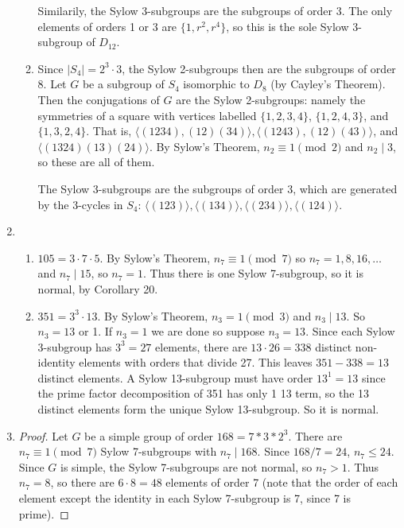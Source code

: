 \documentclass[11pt, letterpaper]{article}
\begin{document}
\begin{enumerate}
\begin{enumerate}
    Similarily, the Sylow 3-subgroups are the subgroups of order 3. The only elements of orders 1 or 3 are $\lbrace 1, r^2, r^4 \rbrace$, so this is the sole Sylow 3-subgroup of $D_{12}$.

    \item Since $\vert S_4 \vert = 2^3 \cdot 3$, the Sylow 2-subgroups then are the subgroups of order 8. Let $G$ be a subgroup of $S_4$ isomorphic to $D_8$ (by Cayley's Theorem). Then the conjugations of $G$ are the Sylow 2-subgroups: namely the symmetries of a square with vertices labelled $\lbrace 1,2,3,4 \rbrace$, $\lbrace 1,2,4,3 \rbrace$, and $\lbrace 1,3,2,4 \rbrace$. That is, $\langle (1234), (12)(34) \rangle, \langle (1243), (12)(43) \rangle$, and $\langle (1324) (13)(24) \rangle$. By Sylow's Theorem, $n_2 \equiv 1 \pmod 2$ and $n_2 \mid 3$, so these are all of them.
    
    The Sylow 3-subgroups are the subgroups of order 3, which are generated by the 3-cycles in $S_4$: $\langle (123) \rangle, \langle (134) \rangle, \langle (234) \rangle, \langle (124) \rangle$.
  \end{enumerate}

  \item \begin{enumerate}
    \item $105 = 3 \cdot 7 \cdot 5$. By Sylow's Theorem, $n_{7} \equiv 1 \pmod 7$ so $n_7 = 1, 8, 16, \dots$ and $n_{7} \mid 15$, so $n_7 = 1$. Thus there is one Sylow 7-subgroup, so it is normal, by Corollary 20.
    \item $351 = 3^3 \cdot 13$. By Sylow's Theorem, $n_3 = 1 \pmod 3$ and $n_3 \mid 13$. So $n_3 = 13$ or 1. If $n_3 = 1$ we are done so suppose $n_3 = 13$. Since each Sylow 3-subgroup has $3^3 = 27$ elements, there are $13 \cdot 26 = 338$ distinct non-identity elements with orders that divide 27. This leaves $351 - 338 = 13$ distinct elements. A Sylow 13-subgroup must have order $13^1 = 13$ since the prime factor decomposition of 351 has only 1 13 term, so the 13 distinct elements form the unique Sylow 13-subgroup. So it is normal.
  \end{enumerate}

  \item \begin{proof}
    Let $G$ be a simple group of order $168 = 7 * 3 * 2^3$. There are $n_7 \equiv 1 \pmod 7$ Sylow 7-subgroups with $n_7 \mid 168$. Since $168 / 7 = 24$, $n_7 \leq 24$. Since $G$ is simple, the Sylow 7-subgroups are not normal, so $n_7 > 1$. Thus $n_7 = 8$, so there are $6 \cdot 8 = 48$ elements of order 7 (note that the order of each element except the identity in each Sylow 7-subgroup is 7, since 7 is prime).
  \end{proof}
  

\end{enumerate}
\end{document}
